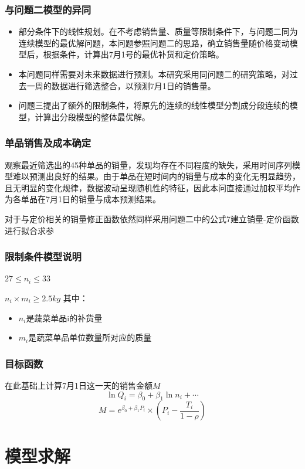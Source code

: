 \documentclass{article}
\begin{document}
\subsubsection{与问题二模型的异同}
\begin{itemize}
    \item 部分条件下的线性规划。在不考虑销售量、质量等限制条件下，与问题二同为连续模型的最优解问题，本问题参照问题二的思路，确立销售量随价格变动模型后，根据条件，计算出7月1号的最优补货和定价策略。
    \item 本问题同样需要对未来数据进行预测。本研究采用同问题二的研究策略，对过去一周的数据进行筛选整合，以预测7月1日的销售量。
    \item 问题三提出了额外的限制条件，将原先的连续的线性模型分割成分段连续的模型，计算出分段模型的整体最优解。
\end{itemize}

\subsubsection{单品销售及成本确定}
观察最近筛选出的45种单品的销量，发现均存在不同程度的缺失，采用时间序列模型难以预测出良好的结果。由于单品在短时间内的销量与成本的变化无明显趋势，且无明显的变化规律，数据波动呈现随机性的特征，因此本问直接通过加权平均作为各单品在7月1日的销量与成本预测结果。

对于与定价相关的销量修正函数依然同样采用问题二中的公式7建立销量-定价函数进行拟合求参

\subsubsection{限制条件模型说明}
$  27 \leq n_i \leq 33$

$ n_i \times m_i \geq 2.5kg$
其中：
\begin{itemize}
    \item $n_i$是蔬菜单品i的补货量
    \item $m_i$是蔬菜单品单位数量所对应的质量
\end{itemize}

\subsubsection{目标函数}
在此基础上计算7月1日这一天的销售金额$M$
\[
\ln Q_i = \beta_0 + \beta_1 \ln n_i + \cdots
\]
\[ M = e^{\beta_0 + \beta_1P_i} \times (P_i -\frac{T_i}{1-\rho} )\]


\section{模型求解}
\end{document}
